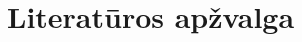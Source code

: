 \documentclass[../gnss_interference_resistant_thesis.tex]{subfiles}
\begin{document}
\section{Literatūros apžvalga}





\end{document}

